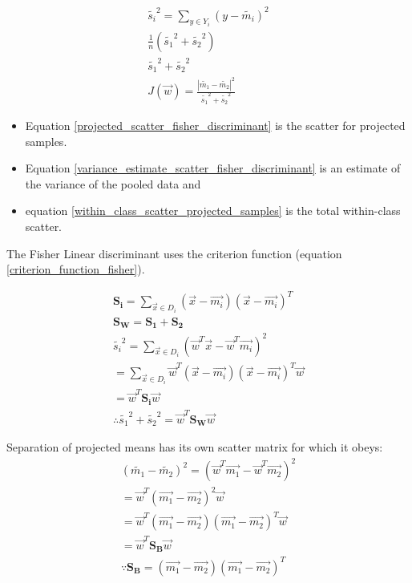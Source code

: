 \documentclass[11pt]{article}
\begin{document}
\begin{eqnarray}
\tilde{s_i} ^2 = \sum _{y \in Y_i} (y - \tilde{m_i}) ^2 \label{projected_scatter_fisher_discriminant}\\
\frac{1}{n} (\tilde{s_1}^2 + \tilde{s_2}^2) \label{variance_estimate_scatter_fisher_discriminant} \\
\tilde{s_1}^2 + \tilde{s_2}^2 \label{within_class_scatter_projected_samples} \\
J(\vec{w}) = \frac{| \tilde{m_1} - \tilde{m_2}|^2} {\tilde{s_1}^2 + \tilde{s_2}^2} \label{criterion_function_fisher}
\end{eqnarray}
\begin{itemize}
	\item Equation \ref{projected_scatter_fisher_discriminant} is the scatter for projected samples.
	\item Equation \ref{variance_estimate_scatter_fisher_discriminant} is an estimate of the variance of the pooled data and 
	\item equation \ref{within_class_scatter_projected_samples} is the total within-class scatter.

\end{itemize}
The Fisher Linear discriminant uses the criterion function (equation \ref{criterion_function_fisher}).  

\begin{eqnarray}
	\mathbf{S_i} = \sum _{\vec{x} \in D_i} ( \vec{x} - \vec{m_i})( \vec{x} - \vec{m_i})^T \\
	\mathbf{S_W} = \mathbf{S_1} + \mathbf{S_2} \label{within_class_scatter_matrix} \\
	\tilde{s_i}^2 = \sum _{\vec{x} \in D_i} ( \vec{w}^T \vec{x} - \vec{w}^T \vec{m_i})^2 \\
	= \sum _{\vec{x} \in D_i} \vec{w}^T ( \vec{x} - \vec{m_i})( \vec{x} - \vec{m_i})^T \vec{w} \\
	= \vec{w}^T \mathbf{S_i} \vec{w} \\
	\therefore \tilde{s_1}^2 + \tilde{s_2}^2 = \vec{w}^T \mathbf{S_W}\vec{w} 
\end{eqnarray}

Separation of projected means has its own scatter matrix for which it obeys:
\begin{eqnarray}
(\tilde{m_1} - \tilde{m_2})^2 = ( \vec{w}^T \vec{m_1} - \vec{w}^T \vec{m_2} )^2  \label {projected_means_definition} \\
= \vec{w}^T(  \vec{m_1} -  \vec{m_2} )^2 \vec{w} \\ 
= \vec{w}^T(  \vec{m_1} -  \vec{m_2} )(  \vec{m_1} -  \vec{m_2} )^T \vec{w} \\
= \vec{w}^T \mathbf{S_B} \vec{w} \\
\because \mathbf{S_B} = (\vec{m_1} - \vec{m_2})(\vec{m_1} - \vec{m_2})^T \label {between_class_scatter_matrix}
\end{eqnarray}
\end{document}
